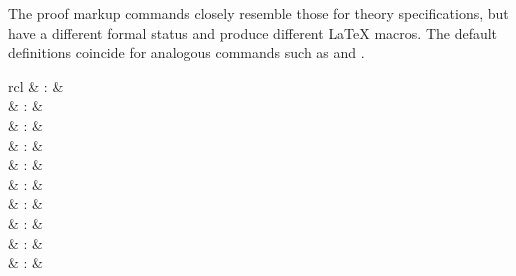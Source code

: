 \begin{isabellebody}
\begin{isamarkuptext}
  \medskip The proof markup commands closely resemble those for theory
  specifications, but have a different formal status and produce
  different {\LaTeX} macros.  The default definitions coincide for
  analogous commands such as \hyperlink{command.section}{\mbox{}} and \hyperlink{command.sect}{\mbox{}}.%
\end{isamarkuptext}%
\isamarkuptrue%
%
\isamarkuptrue%
%
\begin{isamarkuptext}%
\begin{matharray}{rcl}
    \hypertarget{antiquotation.theory}{\hyperlink{antiquotation.theory}{\mbox{}}} & : &  \\
    \hypertarget{antiquotation.thm}{\hyperlink{antiquotation.thm}{\mbox{}}} & : &  \\
    \hypertarget{antiquotation.lemma}{\hyperlink{antiquotation.lemma}{\mbox{}}} & : &  \\
    \hypertarget{antiquotation.prop}{\hyperlink{antiquotation.prop}{\mbox{}}} & : &  \\
    \hypertarget{antiquotation.term}{\hyperlink{antiquotation.term}{\mbox{}}} & : &  \\
    \hypertarget{antiquotation.term-type}{\hyperlink{antiquotation.term-type}{\mbox{}}} & : &  \\
    \hypertarget{antiquotation.typeof}{\hyperlink{antiquotation.typeof}{\mbox{}}} & : &  \\
    \hypertarget{antiquotation.const}{\hyperlink{antiquotation.const}{\mbox{}}} & : &  \\
    \hypertarget{antiquotation.abbrev}{\hyperlink{antiquotation.abbrev}{\mbox{}}} & : &  \\
    \hypertarget{antiquotation.typ}{\hyperlink{antiquotation.typ}{\mbox{}}} & : &  \\

\end{matharray}
\end{isamarkuptext}
\end{isabellebody}
